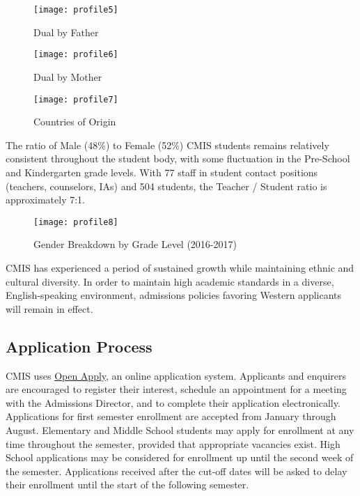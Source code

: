 \begin{figure}
\centering
\texttt{[image: profile5]}
\caption{Dual by Father}
\end{figure}

\begin{figure}
\centering
\texttt{[image: profile6]}
\caption{Dual by Mother}
\end{figure}

\begin{figure}
\centering
\texttt{[image: profile7]}
\caption{Countries of Origin}
\end{figure}


The ratio of Male (48\%) to Female (52\%) CMIS students remains relatively consistent throughout the student body, with some fluctuation in the Pre-School and Kindergarten grade levels.   With 77 staff in student contact positions (teachers, counselors, IAs) and 504 students, the Teacher / Student ratio is approximately 7:1.  

\begin{figure}
\centering
\texttt{[image: profile8]}
\caption{Gender Breakdown by Grade Level (2016-2017)}
\end{figure}


CMIS has experienced a period of sustained growth while maintaining ethnic and cultural diversity.  In order to maintain high academic standards in a diverse, English-speaking environment, admissions policies favoring Western applicants will remain in effect.  


\subsection{Application Process}

CMIS uses \href{https://cmis.openapply.com/}{Open Apply}, an online application system.  Applicants and enquirers are encouraged to register their interest, schedule an appointment for a meeting with the Admissions Director, and to complete their application electronically.  Applications for first semester enrollment are accepted from January through August.  Elementary and Middle School students may apply for enrollment at any time throughout the semester, provided that appropriate vacancies exist.  High School applications may be considered for enrollment up until the second week of the semester.  Applications received after the cut-off dates will be asked to delay their enrollment until the start of the following semester.  

